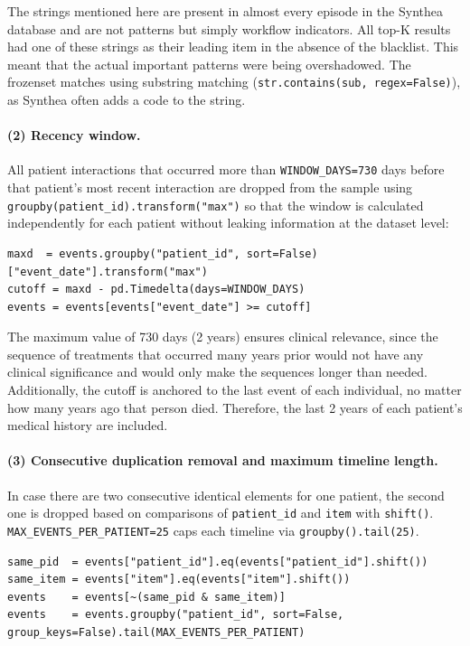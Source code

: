 \noindent The strings mentioned here are present in almost every episode in the Synthea database and are not patterns but simply workflow indicators. All top-K results had one of these strings as their leading item in the absence of the blacklist. This meant that the actual important patterns were being overshadowed. The frozenset matches using substring matching (\texttt{str.contains(sub, regex=False)}), as Synthea often adds a code to the string.

\paragraph{(2) Recency window.} All patient interactions that occurred more than \texttt{WINDOW\_DAYS=730} days before that patient's most recent interaction are dropped from the sample using \texttt{groupby(patient\_id).transform("max")} so that the window is calculated independently for each patient without leaking information at the dataset level:

\begin{lstlisting}[style=pythonstyle]
maxd  = events.groupby("patient_id", sort=False)["event_date"].transform("max")
cutoff = maxd - pd.Timedelta(days=WINDOW_DAYS)
events = events[events["event_date"] >= cutoff]
\end{lstlisting}

\noindent The maximum value of 730 days (2 years) ensures clinical relevance, since the sequence of treatments that occurred many years prior would not have any clinical significance and would only make the sequences longer than needed. Additionally, the cutoff is anchored to the last event of each individual, no matter how many years ago that person died. Therefore, the last 2 years of each patient’s medical history are included.

\paragraph{(3) Consecutive duplication removal and maximum timeline length.} In case there are two consecutive identical elements for one patient, the second one is dropped based on comparisons of \texttt{patient\_id} and \texttt{item} with \texttt{shift()}. \texttt{MAX\_EVENTS\_PER\_PATIENT=25} caps each timeline via \texttt{groupby().tail(25)}.

\begin{lstlisting}[style=pythonstyle]
same_pid  = events["patient_id"].eq(events["patient_id"].shift())
same_item = events["item"].eq(events["item"].shift())
events    = events[~(same_pid & same_item)]
events    = events.groupby("patient_id", sort=False, group_keys=False).tail(MAX_EVENTS_PER_PATIENT)
\end{lstlisting}

